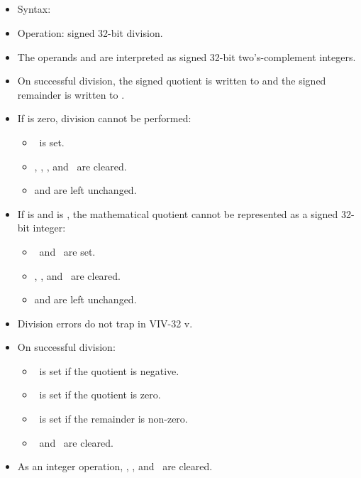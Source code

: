\subsection{}

\begin{itemize}
\item Syntax: 
\item Operation: signed 32-bit division.
\item The operands  and  are interpreted as signed 32-bit
two's-complement integers.
\item On successful division, the signed quotient is written to 
and the signed remainder is written to .

\item If  is zero, division cannot be performed:
\begin{itemize}
\item \flagE\ is set.
\item \flagN, \flagZ, \flagC, and \flagV\ are cleared.
\item {} and  are left unchanged.
\end{itemize}

\item If  is  and  is
, the mathematical quotient cannot be represented as
a signed 32-bit integer:
\begin{itemize}
\item \flagV\ and \flagE\ are set.
\item \flagN, \flagZ, and \flagC\ are cleared.
\item {} and  are left unchanged.
\end{itemize}

\item Division errors do not trap in VIV-32 v\version{}.

\item On successful division:
\begin{itemize}
\item \flagN\ is set if the quotient is negative.
\item \flagZ\ is set if the quotient is zero.
\item \flagC\ is set if the remainder is non-zero.
\item \flagV\ and \flagE\ are cleared.
\end{itemize}

\item As an integer operation, \flagI, \flagU, and \flagX\ are cleared.
\end{itemize}

